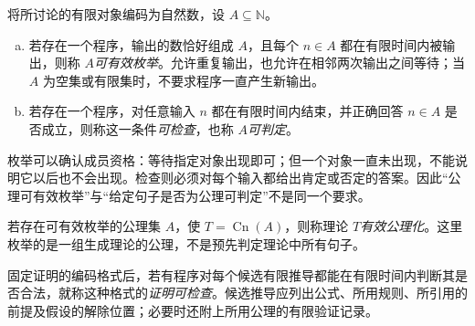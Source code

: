 \documentclass[lang=cn,a4paper,fontset=none,zihao=false,10pt,openany,twoside]{beautybook}
\numberwithin{algorithm}{chapter}
\newcommand{\N}{\mathbb N}
\begin{document}
\begin{definition}[有效枚举与可检查]
将所讨论的有限对象编码为自然数，设 $A\subseteq\N$。
\begin{enumerate}[(a)]
\item 若存在一个程序，输出的数恰好组成 $A$，且每个 $n\in A$ 都在有限时间内被输出，则称 $A$\emph{可有效枚举}。允许重复输出，也允许在相邻两次输出之间等待；当 $A$ 为空集或有限集时，不要求程序一直产生新输出。
\item 若存在一个程序，对任意输入 $n$ 都在有限时间内结束，并正确回答 $n\in A$ 是否成立，则称这一条件\emph{可检查}，也称 $A$\emph{可判定}。
\end{enumerate}
\end{definition}
枚举可以确认成员资格：等待指定对象出现即可；但一个对象一直未出现，不能说明它以后也不会出现。检查则必须对每个输入都给出肯定或否定的答案。因此“公理可有效枚举”与“给定句子是否为公理可判定”不是同一个要求。

\begin{definition}[有效公理化与证明检查]
若存在可有效枚举的公理集 $A$，使 $T=\operatorname{Cn}(A)$，则称理论 $T$\emph{有效公理化}。这里枚举的是一组生成理论的公理，不是预先判定理论中所有句子。

固定证明的编码格式后，若有程序对每个候选有限推导都能在有限时间内判断其是否合法，就称这种格式的\emph{证明可检查}。候选推导应列出公式、所用规则、所引用的前提及假设的解除位置；必要时还附上所用公理的有限验证记录。
\end{definition}
\end{document}
